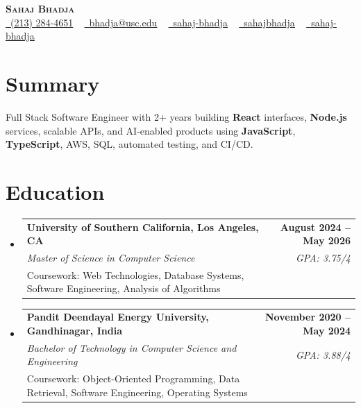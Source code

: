 \documentclass[letterpaper,10pt]{article}
\makeatletter
\newcommand{\sectionGap}{\vspace{-8pt}}
\newcommand{\resumeEduSubheading}[5]{\vspace{-1pt}\item\begin{tabular*}{1.0\textwidth}[t]{l@{\extracolsep{\fill}}r}\textbf{#1} & \textbf{\small #2} \\\textit{\small #3} & \textit{\small #4} \\\small #5 & \\\end{tabular*}\vspace{-4pt}}
\newcommand{\resumeSubHeadingListStart}{\begin{itemize}[leftmargin=0.0in, label={}]}
\newcommand{\resumeSubHeadingListEnd}{\end{itemize}}
\makeatother
\begin{document}
\begin{center}
{\Huge \scshape \textbf{Sahaj Bhadja}} \\ \vspace{1pt}
\small \href{tel:2132844651}{\faPhone\ \underline{(213) 284-4651}} ~ \href{mailto:bhadja@usc.edu}{\raisebox{-0.2\height}\faEnvelope\ \underline{bhadja@usc.edu}} ~
\href{https://www.linkedin.com/in/sahaj-bhadja/}{\raisebox{-0.2\height}\faLinkedin\ \underline{sahaj-bhadja}} ~ \href{https://github.com/SAHAJ-BHADJA}{\raisebox{-0.2\height}\faGithub\ \underline{sahajbhadja}} ~
\href{https://sahaj-bhadja.vercel.app/}{\raisebox{-0.2\height}\faGlobe\ \underline{sahaj-bhadja}}
\end{center}
\vspace{-16pt}
\section{Summary}
\begin{itemize}[leftmargin=0.15in, label={}]
\small{\item{Full Stack Software Engineer with 2+ years building \textbf{React} interfaces, \textbf{Node.js} services, scalable APIs, and AI-enabled products using \textbf{JavaScript}, \textbf{TypeScript}, AWS, SQL, automated testing, and CI/CD.}}
\end{itemize}
\sectionGap
\section{Education}
\resumeSubHeadingListStart
\resumeEduSubheading{University of Southern California, Los Angeles, CA}{August 2024 -- May 2026}{Master of Science in Computer Science}{GPA: 3.75/4}{Coursework: Web Technologies, Database Systems, Software Engineering, Analysis of Algorithms}
\resumeEduSubheading{Pandit Deendayal Energy University, Gandhinagar, India}{November 2020 -- May 2024}{Bachelor of Technology in Computer Science and Engineering}{GPA: 3.88/4}{Coursework: Object-Oriented Programming, Data Retrieval, Software Engineering, Operating Systems}
\resumeSubHeadingListEnd
\sectionGap
\end{document}
